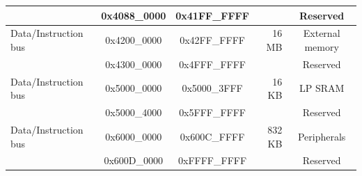 \begin{ThreePartTable}
\begin{longtable}[c]{|p{3.5cm}|c|c|r|c| }
        \rowcolor{gray!25}  & 0x4088\_0000 & 0x41FF\_FFFF &         & Reserved      \\\hline
        {Data/Instruction bus} & 0x4200\_0000 & 0x42FF\_FFFF & 16 MB & External memory \\\hline
        \rowcolor{gray!25}  & 0x4300\_0000 & 0x4FFF\_FFFF &         & Reserved      \\\hline
        {Data/Instruction bus} & 0x5000\_0000 & 0x5000\_3FFF & 16 KB  & LP SRAM\tnote{*} \\\hline 
        \rowcolor{gray!25}  & 0x5000\_4000 & 0x5FFF\_FFFF &         & Reserved      \\\hline
        {Data/Instruction bus} & 0x6000\_0000 & 0x600C\_FFFF & 832 KB  & Peripherals \\\hline
        \rowcolor{gray!25}  & 0x600D\_0000 & 0xFFFF\_FFFF &         & Reserved      \\\hline
\end{longtable}
\end{ThreePartTable}


    
